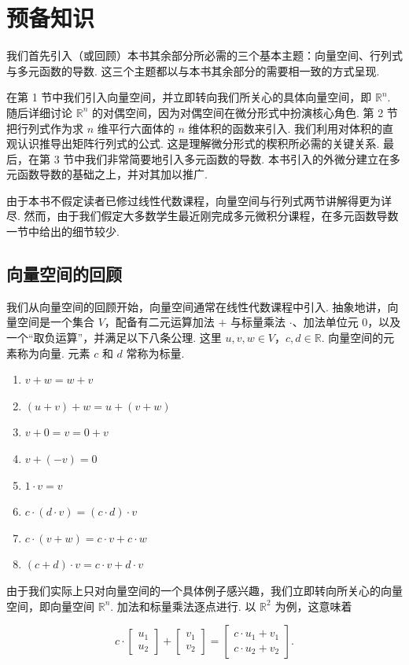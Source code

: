 \chapter{预备知识}

我们首先引入（或回顾）本书其余部分所必需的三个基本主题：向量空间、行列式与多元函数的导数. 这三个主题都以与本书其余部分的需要相一致的方式呈现.

在第 1 节中我们引入向量空间，并立即转向我们所关心的具体向量空间，即 $\mathbb{R}^n$. 随后详细讨论 $\mathbb{R}^n$ 的对偶空间，因为对偶空间在微分形式中扮演核心角色. 第 2 节把行列式作为求 $n$ 维平行六面体的 $n$ 维体积的函数来引入. 我们利用对体积的直观认识推导出矩阵行列式的公式. 这是理解微分形式的楔积所必需的关键关系. 最后，在第 3 节中我们非常简要地引入多元函数的导数. 本书引入的外微分建立在多元函数导数的基础之上，并对其加以推广.

由于本书不假定读者已修过线性代数课程，向量空间与行列式两节讲解得更为详尽. 然而，由于我们假定大多数学生最近刚完成多元微积分课程，在多元函数导数一节中给出的细节较少.

\section{向量空间的回顾}

我们从向量空间的回顾开始，向量空间通常在线性代数课程中引入. 抽象地讲，向量空间是一个集合 $V$，配备有二元运算加法 $+$ 与标量乘法 $\cdot$、加法单位元 $0$，以及一个``取负运算''，并满足以下八条公理. 这里 $u,v,w\in V$，$c,d\in\mathbb{R}$. 向量空间的元素称为向量. 元素 $c$ 和 $d$ 常称为标量.

\begin{enumerate}
  \item $v+w=w+v$
  \item $(u+v)+w=u+(v+w)$
  \item $v+0=v=0+v$
  \item $v+(-v)=0$
  \item $1\cdot v=v$
  \item $c\cdot(d\cdot v)=(c\cdot d)\cdot v$
  \item $c\cdot(v+w)=c\cdot v+c\cdot w$
  \item $(c+d)\cdot v=c\cdot v+d\cdot v$
\end{enumerate}

由于我们实际上只对向量空间的一个具体例子感兴趣，我们立即转向所关心的向量空间，即向量空间 $\mathbb{R}^n$. 加法和标量乘法逐点进行. 以 $\mathbb{R}^2$ 为例，这意味着

\[
c\cdot\begin{bmatrix}u_1\\u_2\end{bmatrix}+\begin{bmatrix}v_1\\v_2\end{bmatrix}
=\begin{bmatrix}c\cdot u_1+v_1\\c\cdot u_2+v_2\end{bmatrix}.
\]

